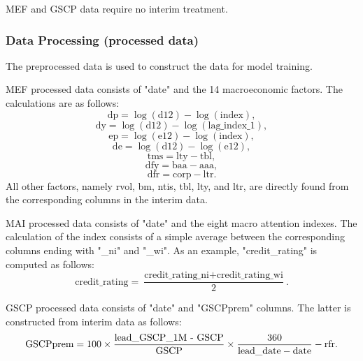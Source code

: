 \documentclass{article}
\begin{document}
MEF and GSCP data require no interim treatment.

\subsubsection{Data Processing (processed data)}
The preprocessed data is used to construct the data for model training.

MEF processed data consists of "date" and the 14 macroeconomic factors. The calculations are as follows:
\begin{equation*}
    \text{dp} = \log{(\text{d12})} - \log{(\text{index})},
\end{equation*}
\begin{equation*}
    \text{dy} = \log{(\text{d12})} - \log{(\text{lag\_index\_1})},
\end{equation*}
\begin{equation*}
    \text{ep} = \log{(\text{e12})} - \log{(\text{index})},
\end{equation*}
\begin{equation*}
    \text{de} = \log{(\text{d12})} - \log{(\text{e12})},
\end{equation*}
\begin{equation*}
    \text{tms} = \text{lty} - \text{tbl},
\end{equation*}
\begin{equation*}
    \text{dfy} = \text{baa} - \text{aaa},
\end{equation*}
\begin{equation*}
    \text{dfr} = \text{corp} - \text{ltr}.
\end{equation*}
All other factors, namely rvol, bm, ntis, tbl, lty, and ltr, are directly found from the corresponding columns in the interim data.

MAI processed data consists of "date" and the eight macro attention indexes. The calculation of the index consists of a simple average between the corresponding columns ending with "\_ni" and "\_wi". As an example, "credit\_rating" is computed as follows:
\begin{equation*}
    \text{credit\_rating} = \frac{\text{credit\_rating\_ni}+\text{credit\_rating\_wi}}{2}.
\end{equation*}

GSCP processed data consists of "date" and "GSCPprem" columns. The latter is constructed from interim data as follows:
\begin{equation*}
    \text{GSCPprem} = 100 \times \frac{\text{lead\_GSCP\_1M - \text{GSCP}}}{\text{GSCP}} \times \frac{360}{\text{lead\_date}-\text{date}} - \text{rfr}.
\end{equation*}
\end{document}
